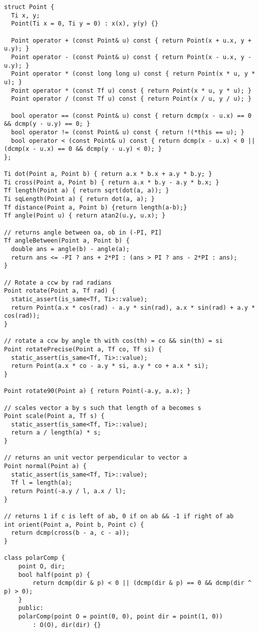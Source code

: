 \documentclass[10pt,a4paper,onesided]{article}
\begin{document}
\begin{multicols*}{3}
\begin{lstlisting}
struct Point {
  Ti x, y;
  Point(Ti x = 0, Ti y = 0) : x(x), y(y) {}

  Point operator + (const Point& u) const { return Point(x + u.x, y + u.y); }
  Point operator - (const Point& u) const { return Point(x - u.x, y - u.y); }
  Point operator * (const long long u) const { return Point(x * u, y * u); }
  Point operator * (const Tf u) const { return Point(x * u, y * u); }
  Point operator / (const Tf u) const { return Point(x / u, y / u); }

  bool operator == (const Point& u) const { return dcmp(x - u.x) == 0 && dcmp(y - u.y) == 0; }
  bool operator != (const Point& u) const { return !(*this == u); }
  bool operator < (const Point& u) const { return dcmp(x - u.x) < 0 || (dcmp(x - u.x) == 0 && dcmp(y - u.y) < 0); }
};

Ti dot(Point a, Point b) { return a.x * b.x + a.y * b.y; }
Ti cross(Point a, Point b) { return a.x * b.y - a.y * b.x; }
Tf length(Point a) { return sqrt(dot(a, a)); }
Ti sqLength(Point a) { return dot(a, a); }
Tf distance(Point a, Point b) {return length(a-b);}
Tf angle(Point u) { return atan2(u.y, u.x); }

// returns angle between oa, ob in (-PI, PI]
Tf angleBetween(Point a, Point b) {
  double ans = angle(b) - angle(a);
  return ans <= -PI ? ans + 2*PI : (ans > PI ? ans - 2*PI : ans);
}

// Rotate a ccw by rad radians
Point rotate(Point a, Tf rad) {
  static_assert(is_same<Tf, Ti>::value);
  return Point(a.x * cos(rad) - a.y * sin(rad), a.x * sin(rad) + a.y * cos(rad));
}

// rotate a ccw by angle th with cos(th) = co && sin(th) = si
Point rotatePrecise(Point a, Tf co, Tf si) {
  static_assert(is_same<Tf, Ti>::value);
  return Point(a.x * co - a.y * si, a.y * co + a.x * si);
}

Point rotate90(Point a) { return Point(-a.y, a.x); }

// scales vector a by s such that length of a becomes s
Point scale(Point a, Tf s) {
  static_assert(is_same<Tf, Ti>::value);
  return a / length(a) * s;
}

// returns an unit vector perpendicular to vector a
Point normal(Point a) {
  static_assert(is_same<Tf, Ti>::value);
  Tf l = length(a);
  return Point(-a.y / l, a.x / l);
}

// returns 1 if c is left of ab, 0 if on ab && -1 if right of ab
int orient(Point a, Point b, Point c) {
  return dcmp(cross(b - a, c - a));
}

class polarComp {
    point O, dir;
    bool half(point p) {
        return dcmp(dir & p) < 0 || (dcmp(dir & p) == 0 && dcmp(dir ^ p) > 0);
    }
    public:
    polarComp(point O = point(0, 0), point dir = point(1, 0))
        : O(O), dir(dir) {}
  

\end{lstlisting}
\end{multicols*}
\end{document}
